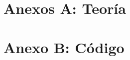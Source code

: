 \documentclass[12pt,oneside]{book}
\begin{document}



{}

\chapter*{Anexos A: Teor\'ia} %
\label{cha:anexos}

\chapter{Anexo B: C\'odigo} %
\label{cha:codigo}

\end{document}
